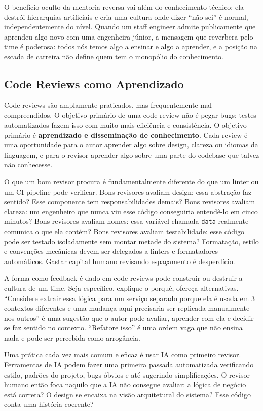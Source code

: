O benefício oculto da mentoria reversa vai além do conhecimento técnico: ela
destrói hierarquias artificiais e cria uma cultura onde dizer ``não sei'' é
normal, independentemente do nível. Quando um staff engineer admite
publicamente que aprendeu algo novo com uma engenheira júnior, a mensagem que
reverbera pelo time é poderosa: todos nós temos algo a ensinar e algo a
aprender, e a posição na escada de carreira não define quem tem o monopólio
do conhecimento.

\subsection{Code Reviews como Aprendizado}

Code reviews são amplamente praticados, mas frequentemente mal compreendidos.
O objetivo primário de uma code review não é pegar bugs; testes automatizados
fazem isso com muito mais eficiência e consistência. O objetivo primário é
\textbf{aprendizado e disseminação de conhecimento}. Cada review é uma
oportunidade para o autor aprender algo sobre design, clareza ou idiomas da
linguagem, e para o revisor aprender algo sobre uma parte do codebase que
talvez não conhecesse.

O que um bom revisor procura é fundamentalmente diferente do que um linter ou
um CI pipeline pode verificar. Bons revisores avaliam design: essa abstração
faz sentido? Esse componente tem responsabilidades demais? Bons revisores
avaliam clareza: um engenheiro que nunca viu esse código conseguiria entendê-lo
em cinco minutos? Bons revisores avaliam nomes: essa variável chamada
\texttt{data} realmente comunica o que ela contém? Bons revisores avaliam
testabilidade: esse código pode ser testado isoladamente sem montar metade do
sistema? Formatação, estilo e convenções mecânicas devem ser delegados a
linters e formatadores automáticos. Gastar capital humano revisando
espaçamento é desperdício.

A forma como feedback é dado em code reviews pode construir ou destruir a
cultura de um time. Seja específico, explique o porquê, ofereça alternativas.
``Considere extrair essa lógica para um serviço separado porque ela é usada em
3 contextos diferentes e uma mudança aqui precisaria ser replicada
manualmente nos outros'' é uma sugestão que o autor pode avaliar, aprender
com ela e decidir se faz sentido no contexto. ``Refatore isso'' é uma ordem
vaga que não ensina nada e pode ser percebida como arrogância.

Uma prática cada vez mais comum e eficaz é usar IA como primeiro revisor.
Ferramentas de IA podem fazer uma primeira passada automatizada verificando
estilo, padrões do projeto, bugs óbvios e até sugerindo simplificações. O
revisor humano então foca naquilo que a IA não consegue avaliar: a lógica de
negócio está correta? O design se encaixa na visão arquitetural do sistema?
Esse código conta uma história coerente?

